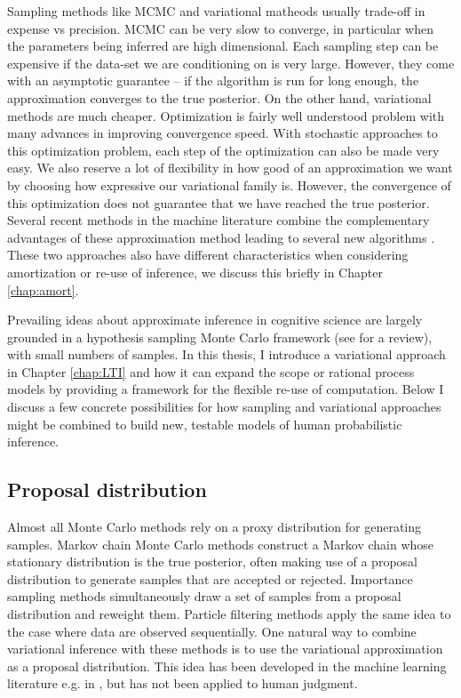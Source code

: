Sampling methods like MCMC and variational matheods usually trade-off in expense vs precision. MCMC can be very slow to converge, in particular when the parameters being inferred are high dimensional. Each sampling step can be expensive if the data-set we are conditioning on is very large. However, they come with an asymptotic guarantee -- if the algorithm is run for long enough, the approximation converges to the true posterior. On the other hand, variational methods are much cheaper. Optimization is fairly well understood problem with many advances in improving convergence speed. With stochastic approaches to this optimization problem, each step of the optimization can also be made very easy. We also reserve a lot of flexibility in how good of an approximation we want by choosing how expressive our variational family is.  However, the convergence of this optimization does not guarantee that we have reached the true posterior. Several recent methods in the machine literature combine the complementary advantages of these approximation method leading to several new algorithms \citep{li2017approximate, naesseth2017variational, ruiz2019contrast}. These two approaches also have different characteristics when considering amortization or re-use of inference, we discuss this briefly in Chapter \ref{chap:amort}. 

Prevailing ideas about approximate inference in cognitive science are largely grounded in a hypothesis sampling Monte Carlo framework (see \citet{sanborn2016bayesian} for a review), with small numbers of samples. In this thesis, I introduce a variational approach in Chapter \ref{chap:LTI} and how it can expand the scope or rational process models by providing a framework for the flexible re-use of computation. Below I discuss a few concrete possibilities for how sampling and variational approaches might be combined to build new, testable models of human probabilistic inference.

\subsection{Proposal distribution}

Almost all Monte Carlo methods rely on a proxy distribution for generating samples. Markov chain Monte Carlo methods construct a Markov chain whose stationary distribution is the true posterior, often making use of a proposal distribution to generate samples that are accepted or rejected. Importance sampling methods simultaneously draw a set of samples from a proposal distribution and reweight them. Particle filtering methods apply the same idea to the case where data are observed sequentially. One natural way to combine variational inference with these methods is to use the variational approximation as a proposal distribution. This idea has been developed in the machine learning literature e.g. in \citet{de2001variational,gu2015neural}, but has not been applied to human judgment.

